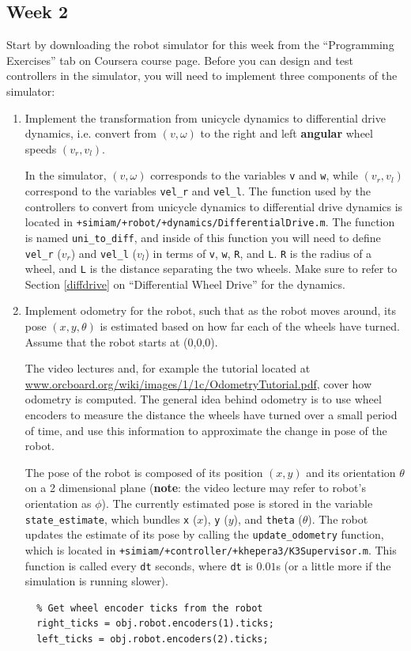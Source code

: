 \documentclass[10pt]{article}
\begin{document}
\subsection{Week 2}
Start by downloading the robot simulator for this week from the ``Programming Exercises'' tab on Coursera course page. Before you can design and test controllers in the simulator, you will need to implement three components of the simulator:

\begin{enumerate}
 \item Implement the transformation from unicycle dynamics to differential drive dynamics, i.e. convert from $(v,\omega)$ to the right and left \textbf{angular} wheel speeds $(v_r,v_l)$.
 
 In the simulator, $(v,\omega)$ corresponds to the variables \texttt{v} and \texttt{w}, while $(v_r,v_l)$ correspond to the variables \texttt{vel\_r} and \texttt{vel\_l}. The function used by the controllers to convert from unicycle dynamics to differential drive dynamics is located in \texttt{+simiam/+robot/+dynamics/DifferentialDrive.m}. The function is named \texttt{uni\_to\_diff}, and inside of this function you will need to define \texttt{vel\_r} ($v_r$) and \texttt{vel\_l} ($v_l$) in terms of \texttt{v}, \texttt{w}, \texttt{R}, and \texttt{L}. \texttt{R} is the radius of a wheel, and \texttt{L} is the distance separating the two wheels. Make sure to refer to Section \ref{diffdrive} on ``Differential Wheel Drive'' for the dynamics.
 
 \item Implement odometry for the robot, such that as the robot moves around, its pose $(x,y,\theta)$ is estimated based on how far each of the wheels have turned. Assume that the robot starts at (0,0,0).
 
 The video lectures and, for example the tutorial located at \url{www.orcboard.org/wiki/images/1/1c/OdometryTutorial.pdf}, cover how odometry is computed. The general idea behind odometry is to use wheel encoders to measure the distance the wheels have turned over a small period of time, and use this information to approximate the change in pose of the robot.

 The pose of the robot is composed of its position $(x,y)$ and its orientation $\theta$ on a 2 dimensional plane (\textbf{note}: the video lecture may refer to robot's orientation as $\phi$). The currently estimated pose is stored in the variable \texttt{state\_estimate}, which bundles \texttt{x} ($x$), \texttt{y} ($y$), and \texttt{theta} ($\theta$). The robot updates the estimate of its pose by calling the \texttt{update\_odometry} function, which is located in \texttt{+simiam/+controller/+khepera3/K3Supervisor.m}. This function is called every \texttt{dt} seconds, where \texttt{dt} is $0.01$s (or a little more if the simulation is running slower).
 \begin{verbatim}  
  % Get wheel encoder ticks from the robot
  right_ticks = obj.robot.encoders(1).ticks;
  left_ticks = obj.robot.encoders(2).ticks;


\end{verbatim}
\end{enumerate}
\end{document}
